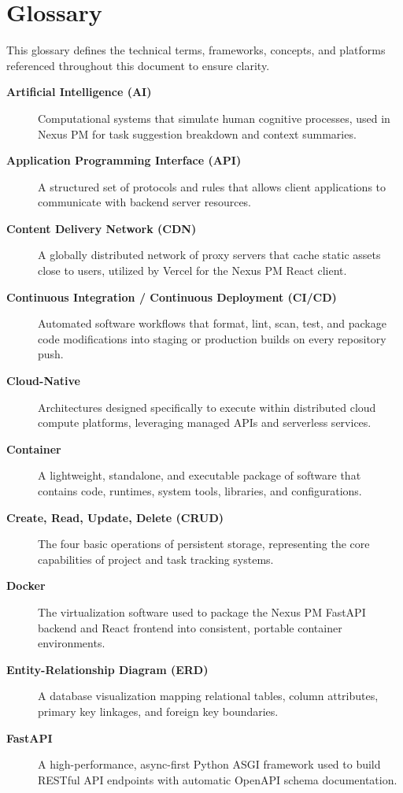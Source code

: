 \chapter{Glossary}
\label{app:glossary}

This glossary defines the technical terms, frameworks, concepts, and platforms referenced throughout this document to ensure clarity.

\begin{description}
    \item[\textbf{Artificial Intelligence (AI)}] Computational systems that simulate human cognitive processes, used in Nexus PM for task suggestion breakdown and context summaries.
    \item[\textbf{Application Programming Interface (API)}] A structured set of protocols and rules that allows client applications to communicate with backend server resources.
    \item[\textbf{Content Delivery Network (CDN)}] A globally distributed network of proxy servers that cache static assets close to users, utilized by Vercel for the Nexus PM React client.
    \item[\textbf{Continuous Integration / Continuous Deployment (CI/CD)}] Automated software workflows that format, lint, scan, test, and package code modifications into staging or production builds on every repository push.
    \item[\textbf{Cloud-Native}] Architectures designed specifically to execute within distributed cloud compute platforms, leveraging managed APIs and serverless services.
    \item[\textbf{Container}] A lightweight, standalone, and executable package of software that contains code, runtimes, system tools, libraries, and configurations.
    \item[\textbf{Create, Read, Update, Delete (CRUD)}] The four basic operations of persistent storage, representing the core capabilities of project and task tracking systems.
    \item[\textbf{Docker}] The virtualization software used to package the Nexus PM FastAPI backend and React frontend into consistent, portable container environments.
    \item[\textbf{Entity-Relationship Diagram (ERD)}] A database visualization mapping relational tables, column attributes, primary key linkages, and foreign key boundaries.
    \item[\textbf{FastAPI}] A high-performance, async-first Python ASGI framework used to build RESTful API endpoints with automatic OpenAPI schema documentation.

\end{description}
